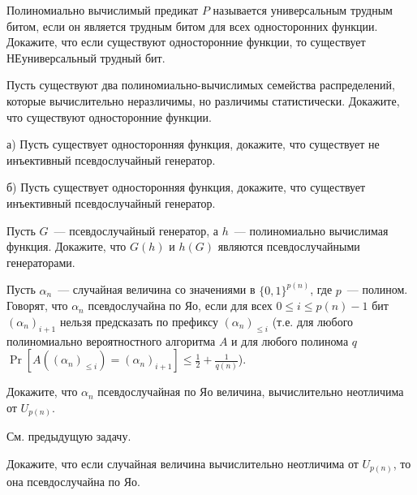 \setcounter{curtask}{1}

\mytitle{}

\begin{task}
    Полиномиально вычислимый предикат $P$ называется универсальным трудным битом,
    если он является трудным битом для всех односторонних функции. Докажите, что если
    существуют односторонние функции, то существует НЕуниверсальный трудный бит.
\end{task}

\begin{task}
    Пусть существуют два полиномиально-вычислимых семейства распределений, которые
    вычислительно неразличимы, но различимы статистически. Докажите, что существуют
    односторонние функции.
\end{task}

\begin{task}
    а) Пусть существует односторонняя функция, докажите, что существует не инъективный
    псевдослучайный генератор.

    б) Пусть существует односторонняя функция, докажите, что существует инъективный
    псевдослучайный генератор.
\end{task}

\begin{task}
    Пусть $G$~--- псевдослучайный генератор, а $h$~--- полиномиально вычислимая
    функция. Докажите, что $G(h)$ и $h(G)$ являются псевдослучайными генераторами.
\end{task}

\begin{task}
    Пусть $\alpha_n$~--- случайная величина со значениями в $\{0, 1\}^{p(n)}$, где
    $p$~--- полином. Говорят, что $\alpha_n$ псевдослучайна по Яо, если для всех $0
    \le i \le p(n) - 1$ бит $(\alpha_n)_{i + 1}$ нельзя предсказать по префиксу
    $(\alpha_n)_{\le i}$ (т.е. для любого полиномиально вероятностного алгоритма $A$
    и для любого полинома $q$ $\Pr[A((\alpha_n)_{\le i}) = (\alpha_n)_{i + 1}] \le
    \frac{1}{2} + \frac{1}{q(n)}$).

    Докажите, что $\alpha_n$ псевдослучайная по Яо величина, вычислительно неотличима
    от $U_{p(n)}$.
\end{task}

\begin{task}
    См. предыдущую задачу.

    Докажите, что если случайная величина вычислительно неотличима от $U_{p(n)}$, то
    она псевдослучайна по Яо.
\end{task}



